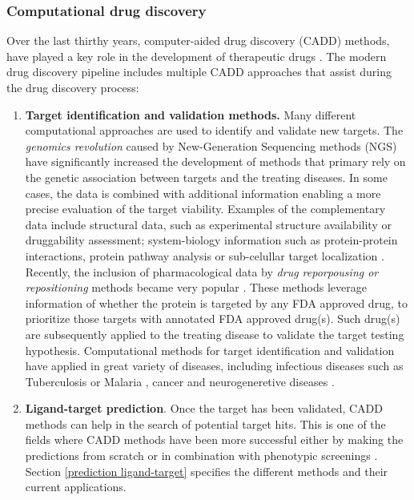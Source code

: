 \documentclass[11pt, b5paper,twoside]{tesi_upf}
\begin{document}
{\begin{figure}[htbp]
	\vspace*{4mm}
\end{figure}
  

\subsubsection{Computational drug discovery}\label{computational drug discovery}

\par Over the last thirthy years, computer-aided drug discovery (CADD) methods, have played a key role in the development of therapeutic drugs \cite{Sliwoski2014}. The modern drug discovery pipeline includes multiple CADD approaches that assist during the drug discovery process:

\begin{enumerate}

\item \textbf{Target identification and validation methods.} Many different computational approaches are used to identify and validate new targets. The \textit{genomics revolution} caused by New-Generation Sequencing methods (NGS) have significantly increased the development of methods that primary rely on the genetic association between targets and the treating diseases. In some cases, the data is combined with additional information enabling a more precise evaluation of the target viability. Examples of the complementary data include structural data,  
such as experimental structure availability or druggability assessment; system-biology information such as protein-protein interactions, protein pathway analysis or sub-celullar target localization \cite{Yang2009}. Recently, the inclusion of pharmacological data by \textit{drug reporpousing or repositioning} methods became very popular \cite{Gottlieb2011, Zhang2011, YutakaFukuoka2013}. These methods leverage information of whether the protein is targeted by any FDA approved drug, to prioritize those targets with annotated FDA approved drug(s). Such drug(s) are subsequently applied to the treating disease to validate the target testing hypothesis. Computational methods for target identification and validation have applied in great variety of diseases, including infectious diseases such as Tuberculosis \cite{Raman2008} or Malaria \cite{Phaiphinit2016}, cancer \cite{Jeon2014} and neurogeneretive diseases \cite{Augustin2012}. 

\item \textbf{Ligand-target prediction}. Once the target has been validated, CADD methods can help in the search of potential target hits. This is one of the fields where CADD methods have been more successful either by making the predictions from scratch or in combination with phenotypic screenings \cite{Martinez-Jimenez2013}. Section \ref{prediction ligand-target} specifies the different methods and their current applications.   


\end{enumerate}}
\end{document}
